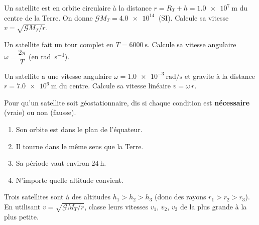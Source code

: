 \documentclass[11pt,a4paper]{article}
\begin{document}

\begin{exo}
Un satellite est en orbite circulaire à la distance $r=R_T+h=\qty{1.0e7}{\metre}$ du
centre de la Terre. On donne $\mathcal{G}M_T=\qty{4.0e14}{}$ (SI). Calcule sa vitesse
$v=\sqrt{\mathcal{G}M_T/r}$.
\end{exo}

\begin{exo}
Un satellite fait un tour complet en $T=\qty{6000}{\second}$. Calcule sa vitesse
angulaire $\omega=\dfrac{2\pi}{T}$ (en \si{\radian\per\second}).
\end{exo}

\begin{exo}
Un satellite a une vitesse angulaire $\omega=\qty{1.0e-3}{\radian\per\second}$ et
gravite à la distance $r=\qty{7.0e6}{\metre}$ du centre. Calcule sa vitesse linéaire
$v=\omega\,r$.
\end{exo}

\begin{exo}
Pour qu'un satellite soit géostationnaire, dis si chaque condition est
\textbf{nécessaire} (vraie) ou non (fausse).
\begin{enumerate}[label=\alph*)]
  \item Son orbite est dans le plan de l'équateur.
  \item Il tourne dans le même sens que la Terre.
  \item Sa période vaut environ $\qty{24}{\hour}$.
  \item N'importe quelle altitude convient.
\end{enumerate}
\end{exo}

\begin{exo}
Trois satellites sont à des altitudes $h_1>h_2>h_3$ (donc des rayons $r_1>r_2>r_3$).
En utilisant $v=\sqrt{\mathcal{G}M_T/r}$, classe leurs vitesses $v_1$, $v_2$, $v_3$
de la plus grande à la plus petite.
\end{exo}
\end{document}
